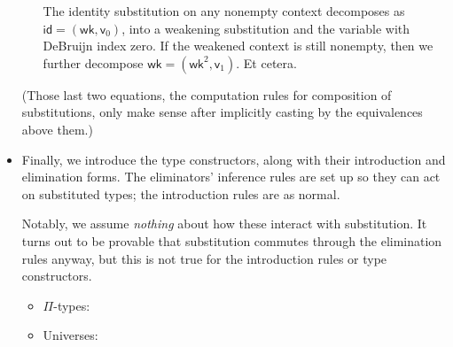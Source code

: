 \documentclass{article}
\begin{document}
\begin{itemize}
\begin{itemize}
        The identity substitution on any nonempty context decomposes as \(\mathsf{id} = (\mathsf{wk},\mathsf{v}_0)\),
        into a weakening substitution and the variable with DeBruijn index zero.
        If the weakened context is still nonempty, then we further decompose \(\mathsf{wk} = (\mathsf{wk}^2,\mathsf{v}_1)\).
        Et cetera.
    \end{itemize}
    (Those last two equations, the computation rules for composition of substitutions,
    only make sense after implicitly casting by the equivalences above them.)
    \item Finally, we introduce the type constructors, along with their introduction and elimination forms.
    The eliminators' inference rules are set up so they can act on substituted types; the introduction rules are as normal.

    Notably, we assume \emph{nothing} about how these interact with substitution. It turns out to be provable that substitution commutes through the elimination rules anyway, but this is not true for the introduction rules or type constructors.

    \begin{itemize}
        \item \(\Pi\)-types:
        \item Universes:
    \end{itemize}
\end{itemize}
\end{document}
